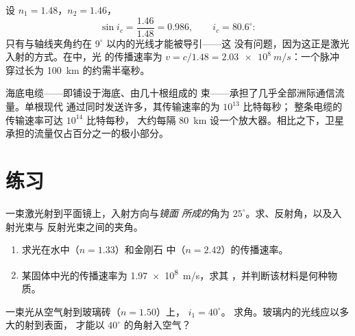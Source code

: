 \begin{example}[用数据看光纤]\label{ex:g10:refraction:fibernumbers}
设 $n_1 = 1.48$，$n_2 = 1.46$，
\[
\sin i_c = \frac{1.46}{1.48} = 0.986,
\qquad i_c = 80.6^\circ :
\]
只有与轴线夹角约在 $9^\circ$ 以内的光线才能被导引——这
没有问题，因为这正是激光入射的方式。在中，光
的传播速率为 $v = c/1.48 = \qty{2.03e8}{m/s}$：一个脉冲
穿过长为 \qty{100}{km} 的约需半毫秒。
\end{example}

\begin{remark}[数据传输的数量级]\label{rem:g10:refraction:datarates}
海底电缆——即铺设于海底、由几十根组成的
束——承担了几乎全部洲际通信流量。单根现代
通过同时发送许多，其传输速率的为 $10^{13}$ 比特每秒；
整条电缆的传输速率可达 $10^{14}$ 比特每秒，
大约每隔 \qty{80}{km} 设一个放大器。相比之下，卫星
承担的流量仅占百分之一的极小部分。
\end{remark}

\section{练习}

\begin{exercise}[$\star$]\label{exo:g10:refraction:1}
一束激光射到平面镜上，入射方向与\emph{镜面
所成的}角为 $25^\circ$。求、反射角，以及入射光束与
反射光束之间的夹角。
\end{exercise}

\begin{exercise}[$\star$]\label{exo:g10:refraction:2}
\begin{enumerate}
  \item 求光在水中（$n = 1.33$）和金刚石
        中（$n = 2.42$）的传播速率。
  \item 某固体中光的传播速率为 \qty{1.97e8}{m/s}，求其
        ，并判断该材料是何种物质。
\end{enumerate}
\end{exercise}

\begin{exercise}[$\star$]\label{exo:g10:refraction:3}
一束光从空气射到玻璃砖（$n = 1.50$）上， $i_1 = 40^\circ$。
求角。玻璃内的光线应以多大的射到表面，
才能以
$40^\circ$ 的角射入空气？
\end{exercise}

